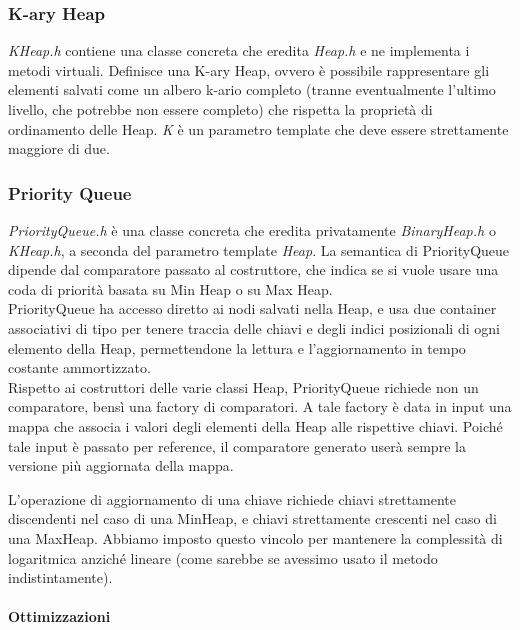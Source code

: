 \subsubsection{K-ary Heap}

\textit{KHeap.h} contiene una classe concreta che eredita \textit{Heap.h} e ne implementa i metodi virtuali. Definisce una K-ary Heap, ovvero è possibile rappresentare gli elementi salvati come un albero k-ario completo (tranne eventualmente l'ultimo livello, che potrebbe non essere completo) che rispetta la proprietà di ordinamento delle Heap.
\textit{K} è un parametro template che deve essere strettamente maggiore di due.

\subsubsection{Priority Queue}

\textit{PriorityQueue.h} è una classe concreta che eredita privatamente \textit{BinaryHeap.h} o \textit{KHeap.h}, a seconda del parametro template \textit{Heap}.
La semantica di PriorityQueue dipende dal comparatore passato al costruttore, che indica se si vuole usare una coda di priorità basata su Min Heap o su Max Heap. \\

\noindent PriorityQueue ha accesso diretto ai nodi salvati nella Heap, e usa due container associativi di tipo  per tenere traccia delle chiavi e degli indici posizionali di ogni elemento della Heap, permettendone la lettura e l'aggiornamento in tempo costante ammortizzato. \\

\noindent Rispetto ai costruttori delle varie classi Heap, PriorityQueue richiede non un comparatore, bensì una factory di comparatori. A tale factory è data in input una mappa che associa i valori degli elementi della Heap alle rispettive chiavi. Poiché tale input è passato per reference, il comparatore generato userà sempre la versione più aggiornata della mappa.

\noindent L'operazione di aggiornamento di una chiave richiede chiavi strettamente discendenti nel caso di una MinHeap, e chiavi strettamente crescenti nel caso di una MaxHeap. Abbiamo imposto questo vincolo per mantenere la complessità di  logaritmica anziché lineare (come sarebbe se avessimo usato il metodo  indistintamente).

\paragraph{Ottimizzazioni}\mbox{} \\

